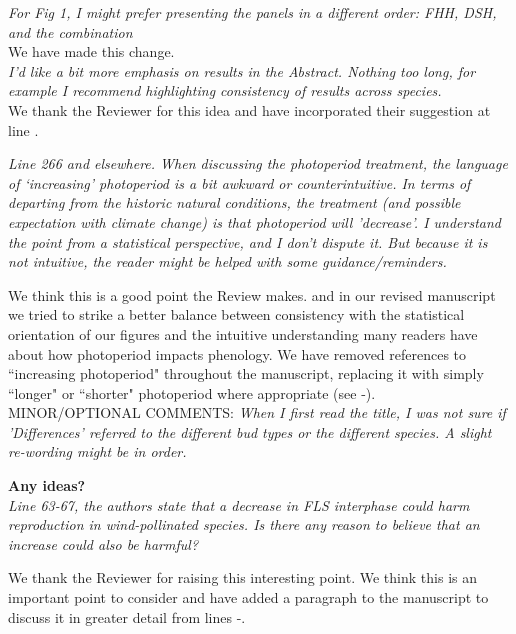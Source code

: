 \documentclass[11pt]{article}
\begin{document}
\emph{For Fig 1, I might prefer presenting the panels in a different order: FHH, DSH, and the combination}\\

We have made this change.\\

\emph{I’d like a bit more emphasis on results in the Abstract. Nothing too long, for example I recommend highlighting consistency of results across species.}\\

We thank the Reviewer for this idea and have incorporated their suggestion at line .

\emph{Line 266 and elsewhere. When discussing the photoperiod treatment, the language of ‘increasing’ photoperiod is a bit awkward or counterintuitive. In terms of departing from the historic natural conditions, the treatment (and possible expectation with climate change) is that photoperiod will 'decrease'. I understand the point from a statistical perspective, and I don’t dispute it. But because it is not intuitive, the reader might be helped with some guidance/reminders.}

We think this is a good point the Review makes. and in our revised manuscript we tried to strike a better balance between consistency with the statistical orientation of our figures and the intuitive understanding many readers have about how photoperiod impacts phenology. We have removed references to ``increasing photoperiod" throughout the manuscript, replacing it with simply ``longer" or ``shorter" photoperiod where appropriate (see -).\\


MINOR/OPTIONAL COMMENTS:
\emph{When I first read the title, I was not sure if 'Differences' referred to the different bud types or the different species. A slight re-wording might be in order.}

\textbf{Any ideas?}\\

\emph{Line 63-67, the authors state that a decrease in FLS interphase could harm reproduction in wind-pollinated species. Is there any reason to believe that an increase could also be harmful?}

\noindent We thank the Reviewer for raising this interesting point. We think this is an important point to consider and have added a paragraph to the manuscript to discuss it in greater detail from lines -. \\
\end{document}
